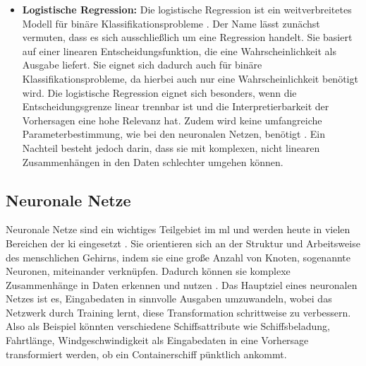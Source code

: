 \begin{itemize}
\pagebreak
    \item \textbf{Logistische Regression:}
    Die logistische Regression ist ein weitverbreitetes Modell für binäre Klassifikationsprobleme \cite{Hastie2009}.  
    Der Name lässt zunächst vermuten, dass es sich ausschließlich um eine Regression handelt.
    Sie basiert auf einer linearen Entscheidungsfunktion, die eine Wahrscheinlichkeit als Ausgabe liefert. 
    Sie eignet sich dadurch auch für binäre Klassifikationsprobleme, da hierbei auch nur eine Wahrscheinlichkeit benötigt wird. 
    Die logistische Regression eignet sich besonders, wenn die Entscheidungsgrenze linear trennbar ist und die Interpretierbarkeit der Vorhersagen eine hohe Relevanz hat.  
    Zudem wird keine umfangreiche Parameterbestimmung, wie bei den neuronalen Netzen, benötigt \cite{Bishop2006}.  
    Ein Nachteil besteht jedoch darin, dass sie mit komplexen, nicht linearen Zusammenhängen in den Daten schlechter umgehen können.  

\end{itemize}



\subsection{Neuronale Netze}

%



Neuronale Netze sind ein wichtiges Teilgebiet im \gls{ml} und werden heute in vielen Bereichen der \gls{ki} eingesetzt \cite{Goodfellow2016}. Sie orientieren sich an der Struktur und Arbeitsweise des menschlichen Gehirns, indem sie eine große Anzahl von Knoten, sogenannte Neuronen, miteinander verknüpfen. Dadurch können sie komplexe Zusammenhänge in Daten erkennen und nutzen \cite{Schmidhuber2015}. Das Hauptziel eines neuronalen Netzes ist es, Eingabedaten in sinnvolle Ausgaben umzuwandeln, wobei das Netzwerk durch Training lernt, diese Transformation schrittweise zu verbessern. 
Also als Beispiel könnten verschiedene Schiffsattribute wie Schiffsbeladung, Fahrtlänge, Windgeschwindigkeit als Eingabedaten in eine Vorhersage transformiert werden, ob ein Containerschiff pünktlich ankommt.

